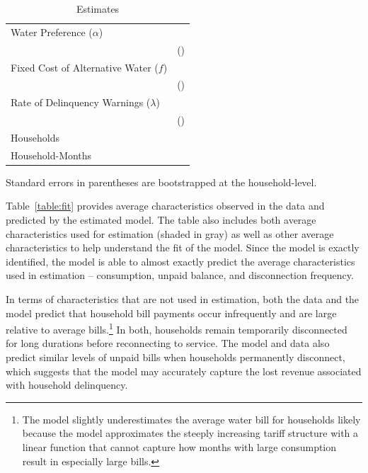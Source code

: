 \documentclass[12pt,table]{article}
\begin{document}
\begin{table}[h!]
\centering
\caption{Estimates}\label{table:estimates}
\begin{threeparttable}
\begin{tabular}{@{}l*{1}{c}@{}}
\toprule
Water Preference  ($\alpha$) &  \\
 &   (\unskip) \\[.4em]
Fixed Cost of Alternative Water ($f$) &   \\
 &    (\unskip) \\[.4em]
Rate of Delinquency Warnings ($\lambda$) &   \\
 &   (\unskip) \\[.8em]
Households &   \\
Household-Months &   \\
\bottomrule
\end{tabular}
\begin{tablenotes}
\item 
\footnotesize
Standard errors in parentheses are bootstrapped at the household-level. 
\end{tablenotes}
\end{threeparttable}
\end{table}

Table~\ref{table:fit} provides average characteristics observed in the data and predicted by the estimated model.  The table also includes both average characteristics used for estimation (shaded in gray) as well as other average characteristics to help understand the fit of the model.  Since the model is exactly identified, the model is able to almost exactly predict the average characteristics used in estimation -- consumption, unpaid balance, and disconnection frequency.

In terms of characteristics that are not used in estimation, both the data and the model predict that household bill payments occur infrequently and are large relative to average bills.\footnote{The model slightly underestimates the average water bill for households likely because the model approximates the steeply increasing tariff structure with a linear function that cannot capture how months with large consumption result in especially large bills.}  In both, households remain temporarily disconnected for long durations before reconnecting to service.  The model and data also predict similar levels of unpaid bills when households permanently disconnect, which suggests that the model may accurately capture the lost revenue associated with household delinquency.
\end{document}
